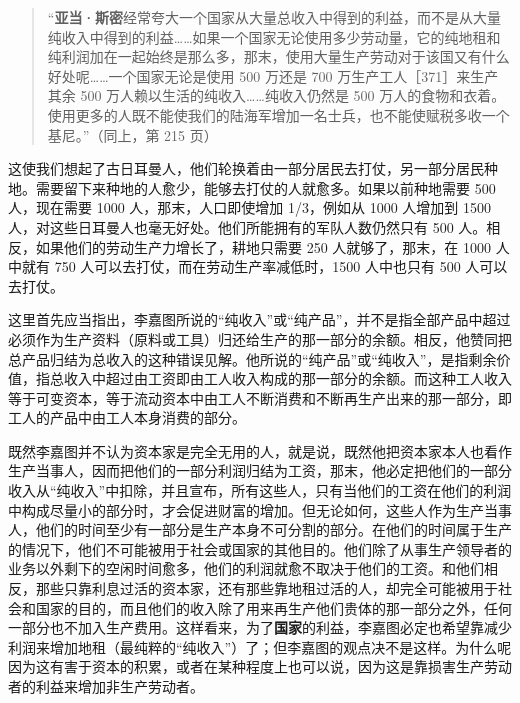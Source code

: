 \begin{quote}“\textbf{亚当·斯密}经常夸大一个国家从大量总收入中得到的利益，而不是从大量纯收入中得到的利益……如果一个国家无论使用多少劳动量，它的纯地租和纯利润加在一起始终是那么多，那末，使用大量生产劳动对于该国又有什么好处呢……一个国家无论是使用 500 万还是 700 万生产工人［371］来生产其余 500 万人赖以生活的纯收入……纯收入仍然是 500 万人的食物和衣着。使用更多的人既不能使我们的陆海军增加一名士兵，也不能使赋税多收一个基尼。”（同上，第 215 页）\end{quote}

这使我们想起了古日耳曼人，他们轮换着由一部分居民去打仗，另一部分居民种地。需要留下来种地的人愈少，能够去打仗的人就愈多。如果以前种地需要 500 人，现在需要 1000 人，那末，人口即使增加 1/3，例如从 1000 人增加到 1500 人，对这些日耳曼人也毫无好处。他们所能拥有的军队人数仍然只有 500 人。相反，如果他们的劳动生产力增长了，耕地只需要 250 人就够了，那末，在 1000 人中就有 750 人可以去打仗，而在劳动生产率减低时，1500 人中也只有 500 人可以去打仗。

这里首先应当指出，李嘉图所说的“纯收入”或“纯产品”，并不是指全部产品中超过必须作为生产资料（原料或工具）归还给生产的那一部分的余额。相反，他赞同把总产品归结为总收入的这种错误见解。他所说的“纯产品”或“纯收入”，是指剩余价值，指总收入中超过由工资即由工人收入构成的那一部分的余额。而这种工人收入等于可变资本，等于流动资本中由工人不断消费和不断再生产出来的那一部分，即工人的产品中由工人本身消费的部分。

既然李嘉图并不认为资本家是完全无用的人，就是说，既然他把资本家本人也看作生产当事人，因而把他们的一部分利润归结为工资，那末，他必定把他们的一部分收入从“纯收入”中扣除，并且宣布，所有这些人，只有当他们的工资在他们的利润中构成尽量小的部分时，才会促进财富的增加。但无论如何，这些人作为生产当事人，他们的时间至少有一部分是生产本身不可分割的部分。在他们的时间属于生产的情况下，他们不可能被用于社会或国家的其他目的。他们除了从事生产领导者的业务以外剩下的空闲时间愈多，他们的利润就愈不取决于他们的工资。和他们相反，那些只靠利息过活的资本家，还有那些靠地租过活的人，却完全可能被用于社会和国家的目的，而且他们的收入除了用来再生产他们贵体的那一部分之外，任何一部分也不加入生产费用。这样看来，为了\textbf{国家}的利益，李嘉图必定也希望靠减少利润来增加地租（最纯粹的“纯收入”）了；但李嘉图的观点决不是这样。为什么呢因为这有害于资本的积累，或者在某种程度上也可以说，因为这是靠损害生产劳动者的利益来增加非生产劳动者。

